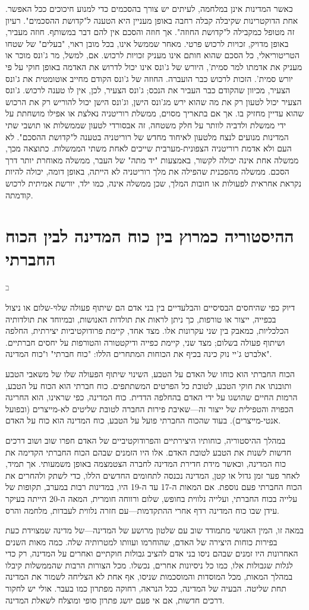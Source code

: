 \documentclass[10pt,oneside]{book}
\newcommand{\hebrewchapter}[2]{%
  \chapter*{#1}%
  \addcontentsline{toc}{chapter}{#1}%
  \lettrine[lines=4, lhang=0.1, loversize=0.5, findent=0pt]{\textcolor{gray} #2}{}%
}
\begin{document}
כאשר המדינות אינן במלחמה, לעיתים יש צורך בהסכמים כדי למנוע חיכוכים ככל האפשר. אחת הדוקטרינות שקיבלה קבלה רחבה באופן מעניין היא הטענה ל"קדושת ההסכמים". רעיון זה מטופל כמקבילה ל"קדושת החוזה". אך חוזה והסכם אין להם דבר במשותף. חוזה מעביר, באופן מדויק, זכויות לרכוש פרטי. מאחר שממשל אינו, בכל מובן ראוי, "בעלים" של שטחו הטריטוריאלי, כל הסכם שהוא חותם אינו מעניק זכויות לרכוש. אם, למשל, מר ג'ונס מוכר או מעניק את אדמתו למר סמית', היורש של ג'ונס אינו יכול לדרוש את האדמה באופן חוקי על פי יורש סמית'. הזכות לרכוש כבר הועברה. החוזה של ג'ונס הקודם מחייב אוטומטית את ג'ונס הצעיר, מכיוון שהקודם כבר העביר את הנכס; ג'ונס הצעיר, לכן, אין לו טענה לרכוש. ג'ונס הצעיר יכול לטעון רק את מה שהוא ירש מג'ונס הישן, וג'ונס הישן יכול להוריש רק את הרכוש שהוא עדיין מחזיק בו. אך אם בתאריך מסוים, ממשלת רוריטניה נאלצת או אפילו מושחתת על ידי ממשלת ולדביה לוותר על חלק משטחה, זה אבסורדי לטעון שממשלות או תושבי שתי המדינות מנועים לנצח מלטעון לאיחוד מחדש של רוריטניה בטענה ל"קדושת ההסכם". לא העם ולא אדמת רוריטניה הצפונית-מערבית שייכים לאחת משתי הממשלות. כתוצאה מכך, ממשלה אחת אינה יכולה לקשור, באמצעות "יד מתה" של העבר, ממשלה מאוחרת יותר דרך הסכם. ממשלה מהפכנית שהפילה את מלך רוריטניה לא הייתה, באופן דומה, יכולה להיות נקראת אחראית לפעולות או חובות המלך, שכן ממשלה אינה, כמו ילד, יורשת אמיתית לרכוש קודמתה.

\hebrewchapter{ההיסטוריה כמרוץ בין כוח המדינה לבין הכוח החברתי}{ב}
דיוק כפי שהיחסים הבסיסיים והבלעדיים בין בני אדם הם שיתוף פעולה שלוּי-שלום או ניצול בכפייה, ייצור או טורפות, כך ניתן לראות את תולדות האנושות, ובמיוחד את תולדותיה הכלכליות, כמאבק בין שני עקרונות אלו. מצד אחד, קיימת פרודוקטיביות יצירתית, החלפה ושיתוף פעולה בשלום; מצד שני, קיימת כפייה ודיקטטורה והטורפות על יחסים חברתיים. אלברט ג'יי נוק כינה בכיף את הכוחות המתחרים הללו: "כוח חברתי" ו"כוח המדינה".

הכוח החברתי הוא כוחו של האדם על הטבע, השינוי שיתוף הפעולה שלו של משאבי הטבע ותובנתו את חוקי הטבע, לטובת כל הפרטים המשתתפים. כוח חברתי הוא הכוח על הטבע, הרמות החיים שהושגו על ידי האדם בהחלפה הדדית. כוח המדינה, כפי שראינו, הוא החריגה הכפויה והטפילית של ייצור זה—שאיבת פירות החברה לטובת שליטים לא-מייצרים (ובפועל אנטי-מייצרים). בעוד שהכוח החברתי פועל על הטבע, כוח המדינה הוא כוח על האדם.

במהלך ההיסטוריה, כוחותיו היצירתיים והפרודוקטיביים של האדם חפרו שוב ושוב דרכים חדשות לשנות את הטבע לטובת האדם. אלו היו הזמנים שבהם הכוח החברתי הקדימה את כוח המדינה, וכאשר מידת חדירת המדינה לחברה הצטמצמה באופן משמעותי. אך תמיד, לאחר פער זמן גדול או קטן, המדינה נכנסה לתחומים החדשים הללו, כדי לשתק ולהחרים את הכוח החברתי פעם נוספת. אם המאות ה-17 עד ה-19 היו, במדינות רבות במערב, תקופות של עלייה בכוח החברתי, ועלייה נלווית בחופש, שלום ורווחה חומרית, המאה ה-20 הייתה בעיקר עידן שבו כוח המדינה רדף אחרי ההתקדמות—עם חזרה נלווית לעבדות, מלחמה והרס.

במאה זו, המין האנושי מתמודד שוב עם שלטון מרושע של המדינה—של מדינה שמצוידת כעת בפירות כוחות היצירה של האדם, שהוחרמו ועוותו למטרותיה שלה. כמה מאות השנים האחרונות היו זמנים שבהם ניסו בני אדם להציב גבולות חוקתיים ואחרים על המדינה, רק כדי לגלות שגבולות אלו, כמו כל ניסיונות אחרים, נכשלו. מכל הצורות הרבות שהממשלות קיבלו במהלך המאות, מכל המוסדות והמוסכמות שניסו, אף אחת לא הצליחה לשמור את המדינה תחת שליטה. הבעיה של המדינה, ככל הנראה, רחוקה מפתרון כמו בעבר. אולי יש לחקור דרכים חדשות, אם אי פעם יושג פתרון סופי ומוצלח לשאלת המדינה.
\end{document}
